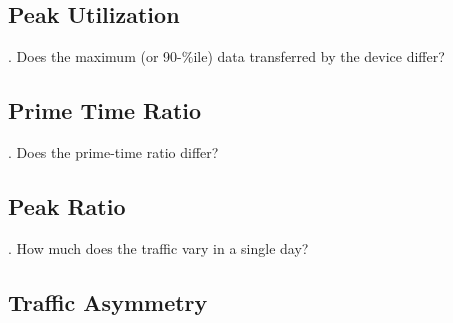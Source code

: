 \subsection{Peak Utilization}
\label{subsec:peak-util}

. Does the maximum (or 90-\%ile) data transferred by the device differ?

\subsection{Prime Time Ratio}
\label{subsec:prime-time}

. Does the prime-time ratio differ?

\subsection{Peak Ratio}
\label{subsec:peak-ratio}

. How much does the traffic vary in a single day?


\subsection{Traffic Asymmetry}
\label{subsec:asymmetry}
